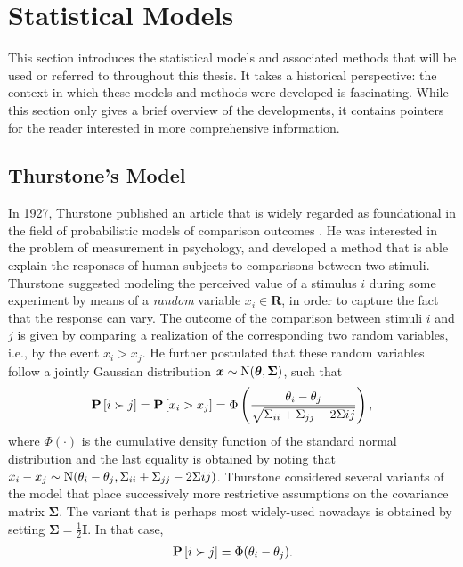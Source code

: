 \section{Statistical Models}
\label{in:sec:models}

This section introduces the statistical models and associated methods that will be used or referred to throughout this thesis.
It takes a historical perspective: the context in which these models and methods were developed is fascinating.
While this section only gives a brief overview of the developments, it contains pointers for the reader interested in more comprehensive information.

\subsection{Thurstone's Model}
In 1927, Thurstone published an article that is widely regarded as foundational in the field of probabilistic models of comparison outcomes \citep{thurstone1927law}.
He was interested in the problem of measurement in psychology, and developed a method that is able explain the responses of human subjects to comparisons between two stimuli.
Thurstone suggested modeling the perceived value of a stimulus $i$ during some experiment by means of a \emph{random} variable $x_i \in \mathbf{R}$, in order to capture the fact that the response can vary.
The outcome of the comparison between stimuli $i$ and $j$ is given by comparing a realization of the corresponding two random variables, i.e., by the event $x_i > x_j$.
He further postulated that these random variables follow a jointly Gaussian distribution $\bm{x} \sim \mathrm{N}( \bm{\theta}, \bm{\Sigma} )$, such that
\begin{align*}
\mathbf{P}\left[ i \succ j \right] = \mathbf{P}\left[ x_i > x_j \right] = \Phi \left( \frac{\theta_i - \theta_j}{\sqrt{\Sigma_{ii} + \Sigma_{jj} - 2\Sigma{ij}}} \right),
\end{align*}
where $\Phi(\cdot)$ is the cumulative density function of the standard normal distribution and the last equality is obtained by noting that $x_i - x_j \sim \mathrm{N}( \theta_i - \theta_j, \Sigma_{ii} + \Sigma_{jj} - 2\Sigma{ij} )$.
Thurstone considered several variants of the model that place successively more restrictive assumptions on the covariance matrix $\bm{\Sigma}$.
The variant that is perhaps most widely-used nowadays is obtained by setting $\bm{\Sigma} = \tfrac{1}{2} \bm{I}$.
In that case,
\begin{align}
\label{in:eq:thu5}
\mathbf{P}\left[ i \succ j \right] = \Phi(\theta_i - \theta_j).
\end{align}
